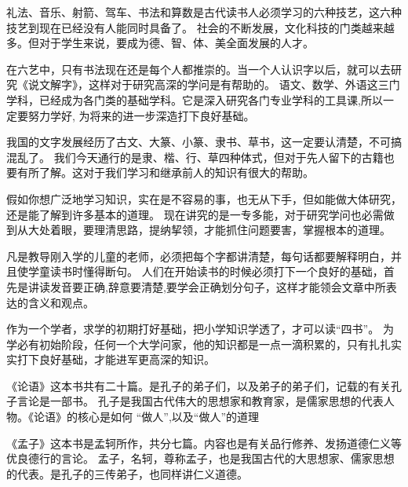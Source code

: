 \documentclass[avery5371,grid]{flashcards}
\begin{document}
{礼法、音乐、射箭、驾车、书法和算数是古代读书人必须学习的六种技艺，这六种技艺到现在已经没有人能同时具备了。} %
{社会的不断发展，文化科技的门类越来越多。但对于学生来说，要成为德、智、体、美全面发展的人才。} %

{在六艺中，只有书法现在还是每个人都推崇的。当一个人认识字以后，就可以去研究《说文解字》，这样对于研究高深的学问是有帮助的。} %
{语文、数学、外语这三门学科，已经成为各门类的基础学科。它是深入研究各门专业学科的工具课,所以一定要努力学好, 为将来的进一步深造打下良好基础。} %

{我国的文字发展经历了古文、大篆、小篆、隶书、草书，这一定要认清楚，不可搞混乱了。} %
{我们今天通行的是隶、楷、行、草四种体式，但对于先人留下的古籍也要有所了解。这对于我们学习和继承前人的知识有很大的帮助。} %

{假如你想广泛地学习知识，实在是不容易的事，也无从下手，但如能做大体研究，还是能了解到许多基本的道理。} %
{现在讲究的是一专多能，对于研究学问也必需做到从大处着眼，要理清思路，提纳挈领，才能抓住问题要害，掌握根本的道理。} %



{凡是教导刚入学的儿童的老师，必须把每个字都讲清楚，每句话都要解释明白，并且使学童读书时懂得断句。} %
{人们在开始读书的时候必须打下一个良好的基础，首先是讲读发音要正确,辞意要清楚,要学会正确划分句子，这样才能领会文章中所表达的含义和观点。} %

{作为一个学者，求学的初期打好基础，把小学知识学透了，才可以读“四书”。} %
{为学必有初始阶段，任何一个大学问家，他的知识都是一点一滴积累的，只有扎扎实实打下良好基础，才能进军更高深的知识。} %

{《论语》这本书共有二十篇。是孔子的弟子们，以及弟子的弟子们，记载的有关孔子言论是一部书。} %
{孔子是我国古代伟大的思想家和教育家，是儒家思想的代表人物。《论语》的核心是如何 “做人”,以及“做人”的道理} %

{《孟子》这本书是孟轲所作，共分七篇。内容也是有关品行修养、发扬道德仁义等优良德行的言论。} %
{孟子，名轲，尊称孟子，也是我国古代的大思想家、儒家思想的代表。是孔子的三传弟子，也同样讲仁义道德。} %
\end{document}
